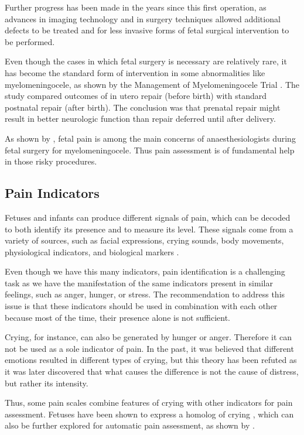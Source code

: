 Further progress has been made in the years since this first operation, as advances in imaging technology and in surgery techniques allowed additional defects to be treated and for less invasive forms of fetal surgical intervention to be performed.

Even though the cases in which fetal surgery is necessary are relatively rare, it has become the standard form of intervention in some abnormalities like myelomeningocele, as shown by the Management of Myelomeningocele Trial \citep{Adzick2011}. The study compared outcomes of in utero repair (before birth) with standard postnatal repair (after birth). The conclusion was that prenatal repair might result in better neurologic function than repair deferred until after delivery.

As shown by \cite{Devoto2017}, fetal pain is among the main concerns of anaesthesiologists during fetal surgery for myelomeningocele. Thus pain assessment is of fundamental help in those risky procedures.

\subsection{Pain Indicators}

Fetuses and infants can produce different signals of pain, which can be decoded to both identify its presence and to measure its level. These signals come from a variety of sources, such as facial expressions, crying sounds, body movements, physiological indicators, and biological markers \citep{Bellieni2012}. 

Even though we have this many indicators, pain identification is a challenging task as we have the manifestation of the same indicators present in similar feelings, such as anger, hunger, or stress. The recommendation to address this issue is that these indicators should be used in combination with each other \citep{Bellieni2012} because most of the time, their presence alone is not sufficient. 

Crying, for instance, can also be generated by hunger or anger. Therefore it can not be used as a sole indicator of pain. In the past, it was believed that different emotions resulted in different types of crying, but this theory has been refuted as it was later discovered that what causes the difference is not the cause of distress, but rather its intensity. 

Thus, some pain scales combine features of crying with other indicators for pain assessment. Fetuses have been shown to express a homolog of crying \citep{Gingras2005}, which can also be further explored for automatic pain assessment, as shown by \cite{abs-1909-02543}. 

